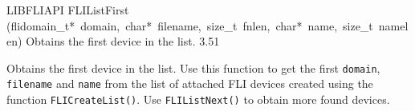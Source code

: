 \documentclass{article}
\begin{document}
\begin{cxxentry}
\begin{cxxfunction}
\begin{cxxdoc}
\end{cxxdoc}
\end{cxxfunction}
\begin{cxxfunction}
{LIBFLIAPI}
        {FLIListFirst}
        {(flidomain\_t*\ domain,\ char*\ filename,\ size\_t\ fnlen,\ char*\ name,\ size\_t\ namelen)}
        { Obtains the first device in the list.}
        {3.51}
\begin{cxxdoc}

Obtains the first device in the list. Use this function to
get the first \texttt{domain}, \texttt{filename} and \texttt{name}
from the list of attached FLI devices created using
the function \texttt{FLICreateList()}. Use
\texttt{FLIListNext()} to obtain more found devices.



\end{cxxdoc}
\end{cxxfunction}
\end{cxxentry}
\end{document}
